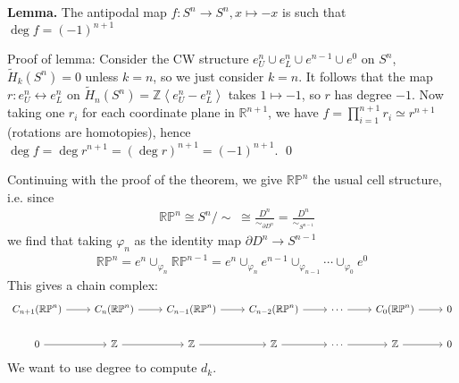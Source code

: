 \documentclass[11pt]{article}
\theoremstyle{definition}
\newcommand{\set}[1]{\{#1\}}
\newcommand{\gen}[1]{\left\langle #1 \right\rangle}
\begin{document}
    \textbf{Lemma.} The antipodal map \(f: S^n \to S^n, x \mapsto -x\) is such that \(\deg f = (-1)^{n+1}\)

    Proof of lemma: Consider the CW structure \(e_U^n \cup e_L^n \cup e^{n-1} \cup e^0\) on \(S^n\), \(\tilde{H}_k(S^n) = 0\) unless \(k=n\), so we just consider \(k=n\). It follows that the map \(r: e_U^n \leftrightarrow e_L^n\) on \(\tilde{H}_n(S^n) = \mathbb{Z}\gen{e_U^n - e_L^n}\) takes \(1 \mapsto -1\), so \(r\) has degree \(-1\). Now taking one \(r_i\) for each coordinate plane in \(\mathbb{R}^{n+1}\), we have \(f = \prod_{i=1}^{n+1} r_i \simeq r^{n+1}\) (rotations are homotopies), hence \(\deg f = \deg r^{n+1} = (\deg r)^{n+1} = (-1)^{n+1}\). \qed

    Continuing with the proof of the theorem, we give \(\mathbb{RP}^n\) the usual cell structure, i.e. since
    \begin{align*}
        &\mathbb{RP}^n \cong S^n/\!\!\sim \;\cong \frac{D^n}{\sim_{\partial D^n}} = \frac{D^n}{\sim_{S^{n-1}}}
    \end{align*}
    we find that taking \(\varphi_n\) as the identity map \(\partial D^n \to S^{n-1}\)
    \begin{align*}
        \mathbb{RP}^n = e^n \cup_{\varphi_n} \mathbb{RP}^{n-1} = e^n \cup_{\varphi_n} e^{n-1} \cup_{\varphi_{n-1}} \cdots \cup_{\varphi_0} e^0
    \end{align*}
    This gives a chain complex:
    \begin{equation*}
        \begin{tikzcd}
            C_{n+1}(\mathbb{RP}^n) \arrow[r] &C_n(\mathbb{RP}^n) \arrow[r] &C_{n-1}(\mathbb{RP}^n) \arrow[r] &C_{n-2}(\mathbb{RP}^n) \arrow[r] &\cdots \arrow[r] &C_0(\mathbb{RP}^n) \arrow[r] & 0 \\
            0 \arrow[r] &\mathbb{Z} \arrow[r] &\mathbb{Z} \arrow[r] &\mathbb{Z} \arrow[r] &\cdots \arrow[r] &\mathbb{Z} \arrow[r] & 0
        \end{tikzcd}
    \end{equation*}
    We want to use degree to compute \(d_k\).
\end{document}
